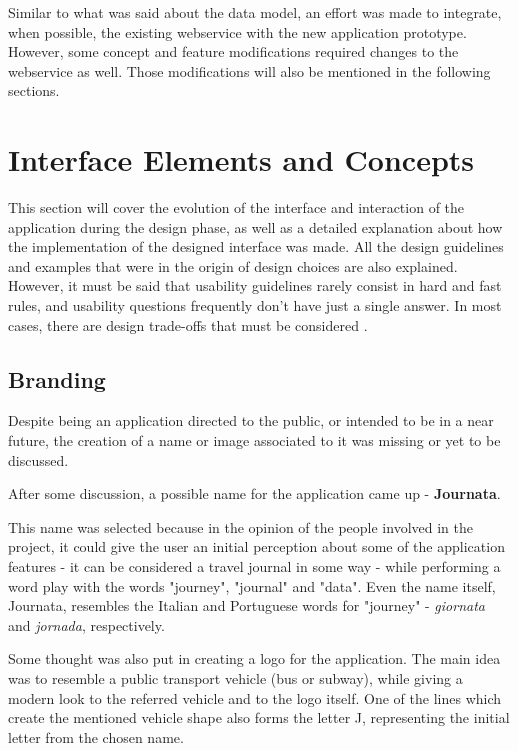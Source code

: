Similar to what was said about the data model, an effort was made to integrate, when possible, the existing webservice with the new application prototype. However, some concept and feature modifications required changes to the webservice as well. Those modifications will also be mentioned in the following sections.

\clearpage

\section{Interface Elements and Concepts}\label{interfacecon}

This section will cover the evolution of the interface and interaction of the application during the design phase, as well as a detailed explanation about how the implementation of the designed interface was made.
All the design guidelines and examples that were in the origin of design choices are also explained. However, it must be said that usability guidelines rarely consist in hard and fast rules, and usability questions frequently don't have just a single answer. In most cases, there are design trade-offs that must be considered \cite{kn:NB12}.

\subsection{Branding}

Despite being an application directed to the public, or intended to be in a near future, the creation of a name or image associated to it was missing or yet to be discussed.


After some discussion, a possible name for the application came up - \textbf{Journata}.

This name was selected because in the opinion of the people involved in the project, it could give the user an initial perception about some of the application features - it can be considered a travel journal in some way - while performing a word play with the words "journey", "journal" and "data". Even the name itself, Journata, resembles the Italian and Portuguese words for "journey" - \emph{giornata} and \emph{jornada}, respectively.

Some thought was also put in creating a logo for the application. The main idea was to resemble a public transport vehicle (bus or subway), while giving a modern look to the referred vehicle and to the logo itself. One of the lines which create the mentioned vehicle shape also forms the letter J, representing the initial letter from the chosen name.

